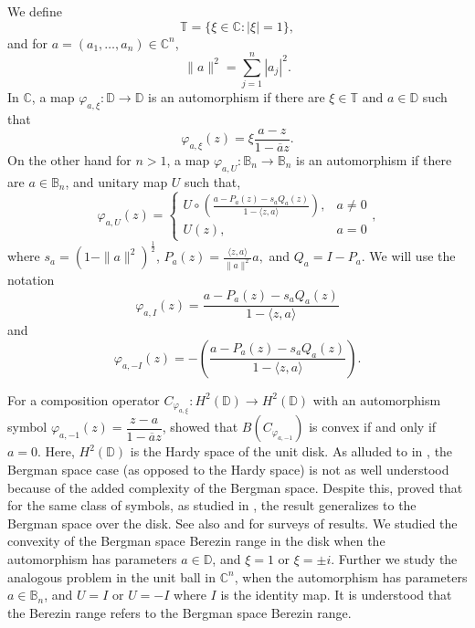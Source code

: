 \documentclass{amsart}
\theoremstyle{remark}
\newcommand{\C}{\mathbb{C}}
\begin{document}
We define 
\[\mathbb{T}=\{\xi \in \mathbb{C}: |\xi|=1\},\] 
and for $a=(a_1,\ldots,a_n)\in \mathbb{C}^n$, \[\|a\|^2=\sum_{j=1}^n |a_j|^2.\]
In $\C$, a map $\varphi_{a,\xi}:\mathbb{D} \rightarrow \mathbb{D}$ is an automorphism if there are $\xi \in \mathbb{T}$ and $a \in \mathbb{D}$ such that 
\[\varphi_{a,\xi}(z)=\xi\dfrac{a-z}{1-\overline{a}z}.\]
On the other hand for $n > 1$, a map $\varphi_{a,U}: \mathbb{B}_{n} \to \mathbb{B}_{n}$ is an automorphism if there are $a \in \mathbb{B}_{n}$, and unitary map $U$ such that,
\[\varphi_{a,U}(z)= \begin{cases}U\circ\left(\frac{a-P_a(z)-s_aQ_a(z)}{1-\langle z,a\rangle}\right), &a \neq 0 \\ U(z), &a = 0\end{cases},\]
where $s_a=(1-\|a\|^2)^{\frac{1}{2}}$, $P_a(z)=\frac{\langle z,a\rangle}{\|a\|^2}a,$ and $Q_a=I-P_a$. We will use the notation 
\[\varphi_{a,I}(z)=\frac{a-P_a(z)-s_aQ_a(z)}{1-\langle z,a\rangle}\] and 
\[\varphi_{a,-I}(z)=-\left(\frac{a-P_a(z)-s_aQ_a(z)}{1-\langle z,a\rangle}\right).\]

For a composition operator $C_{\varphi_{a,\xi}}: H^2(\mathbb{D})\rightarrow H^2(\mathbb{D})$ with an automorphism symbol $\varphi_{a,-1}(z)=\dfrac{z-a}{1-\overline{a}z}$, \cite{cowen2022convexity} showed that $B(C_{\varphi_{a,-1}})$ is convex if and only if $a=0$.  Here, $H^2(\mathbb{D})$ is the Hardy space of the unit disk.  As alluded to in \cite{cowen2022convexity}, the Bergman space case (as opposed to the Hardy space) is not as well understood because of the added complexity of the Bergman space.  Despite this, \cite{augustine2023composition} proved that for the same class of symbols, as studied in \cite{cowen2022convexity}, the result generalizes to the Bergman space over the disk. See also \cite{AUGUSTINE2026103762} and \cite{AS} for surveys of results.  We studied the convexity of the Bergman space Berezin range in the disk when the automorphism has parameters $a \in \mathbb{D}$, and $\xi = 1$ or $\xi = \pm i$. Further we study the analogous problem in the unit ball in $\C^{n}$, when the automorphism has parameters $a \in \mathbb{B}_{n}$, and $U=I$ or $U=-I$ where $I$ is the identity map.  It is understood that the Berezin range refers to the Bergman space Berezin range.  

\end{document}
